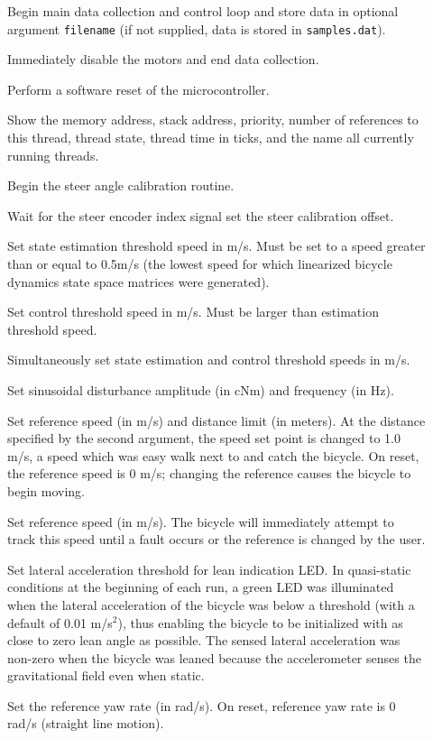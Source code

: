 \begin{description}
  \item[] Begin main data collection and control loop and store
    data in optional argument \verb|filename| (if not supplied, data is stored in
    \verb|samples.dat|).
  \item[] Immediately disable the motors and end data collection.
  \item[] Perform a software reset of the microcontroller.
  \item[] Show the memory address, stack address, priority, number
    of references to this thread, thread state, thread time in ticks, and the
    name all currently running threads.
  \item[] Begin the steer angle calibration routine.
  \item[] Wait for the steer encoder index signal set the steer calibration offset.
  \item[] Set state estimation threshold speed in m/s.
    Must be set to a speed greater than or equal to 0.5m/s (the lowest speed
    for which linearized bicycle dynamics state space matrices were generated).
  \item[] Set control threshold speed in m/s. Must be larger than estimation threshold speed.
  \item[] Simultaneously set state estimation
    and control threshold speeds in m/s.
  \item[] Set sinusoidal disturbance amplitude (in
    cNm) and frequency (in Hz).
  \item[] Set reference speed (in m/s) and
    distance limit (in meters). At the distance specified by the second
    argument, the speed set point is changed to 1.0 m/s, a speed which was easy
    walk next to and catch the bicycle. On reset, the reference speed is 0 m/s;
    changing the reference causes the bicycle to begin moving.
  \item[] Set reference speed (in m/s). The bicycle will
    immediately attempt to track this speed until a fault occurs or the
    reference is changed by the user.
  \item[] Set lateral acceleration threshold for lean indication
    LED. In quasi-static conditions at the beginning of each run, a green LED
    was illuminated when the lateral acceleration of the bicycle was below a
    threshold (with a default of 0.01 m/s$^2$), thus enabling the bicycle to be
    initialized with as close to zero lean angle as possible. The sensed
    lateral acceleration was non-zero when the bicycle was leaned because the
    accelerometer senses the gravitational field even when static.
  \item[] Set the reference yaw rate (in rad/s). On
    reset, reference yaw rate is 0 rad/s (straight line motion).

\end{description}

